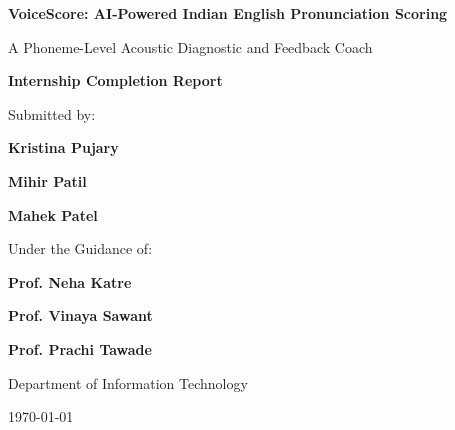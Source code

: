 \documentclass[12pt,a4paper]{report}
\begin{document}
\begin{titlepage}
    \centering
    \vspace*{1in}
    
    {\Huge \bfseries VoiceScore: AI-Powered Indian English Pronunciation Scoring\par}
    \vspace{0.5in}
    {\Large A Phoneme-Level Acoustic Diagnostic and Feedback Coach\par}
    \vspace{1.5in}
    
    {\Large \textbf{Internship Completion Report}\par}
    \vspace{0.5in}
    
    {\Large Submitted by:\par}
    \vspace{0.15in}
    {\Large \textbf{Kristina Pujary}\par}
    {\Large \textbf{Mihir Patil}\par}
    {\Large \textbf{Mahek Patel}\par}
    \vspace{0.3in}
    {\Large Under the Guidance of:\par}
    \vspace{0.15in}
    {\Large \textbf{Prof. Neha Katre}\par}
    {\Large \textbf{Prof. Vinaya Sawant}\par}
    {\Large \textbf{Prof. Prachi Tawade}\par}
    \vspace{0.4in}
    {\Large Department of Information Technology\par}
    \vspace{0.3in}
    {\large \today\par}
\end{titlepage}




\tableofcontents
\listoffigures
\listoftables
\newpage













\end{document}

